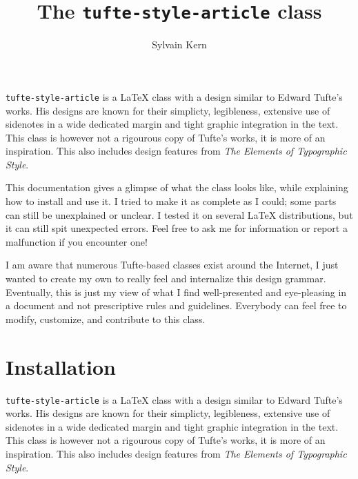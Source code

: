 \documentclass[raggedright, 11pt]{tufte-style-article}
\title{The \texttt{tufte-style-article} class}
\author{Sylvain Kern}
\begin{document}
	
\maketitle	

\texttt{tufte-style-article} is a \LaTeX{} class with a design similar to Edward Tufte's works. His designs are known for their simplicty, legibleness, extensive use of sidenotes in a wide dedicated margin and tight graphic integration in the text. This class is however not a rigourous copy of Tufte's works, it is more of an inspiration. This also includes design features from \textit{The Elements of Typographic Style}.

This documentation gives a glimpse of what the class looks like, while explaining how to install and use it. I tried to make it as complete as I could; some parts can still be unexplained or unclear. I tested it on several \LaTeX{} distributions, but it can still spit unexpected errors. Feel free to ask me for information or report a malfunction if you encounter one!

I am aware that numerous Tufte-based classes exist around the Internet, I just wanted to create my own to really feel and internalize this design grammar. Eventually, this is just my view of what I find well-presented and eye-pleasing in a document and not prescriptive rules and guidelines. Everybody can feel free to modify, customize, and contribute to this class.



\tableofcontents

\newpage

\section{Installation}

\texttt{tufte-style-article} is a \LaTeX{} class with a design similar to Edward Tufte's works. His designs are known for their simplicty, legibleness, extensive use of sidenotes in a wide dedicated margin and tight graphic integration in the text. This class is however not a rigourous copy of Tufte's works, it is more of an inspiration. This also includes design features from \textit{The Elements of Typographic Style}.
\end{document}
